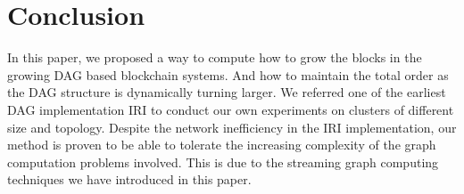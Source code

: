 \section{Conclusion}
In this paper, we proposed a way to compute how to grow the blocks in the growing DAG based blockchain systems. 
And how to maintain the total order as the DAG structure is dynamically turning larger.
We referred one of the earliest DAG implementation IRI to conduct our own experiments on clusters of different size and topology. 
Despite the network inefficiency in the IRI implementation, 
our method is proven to be able to tolerate the increasing complexity of the graph computation problems involved. 
This is due to the streaming graph computing techniques we have introduced in this paper.
